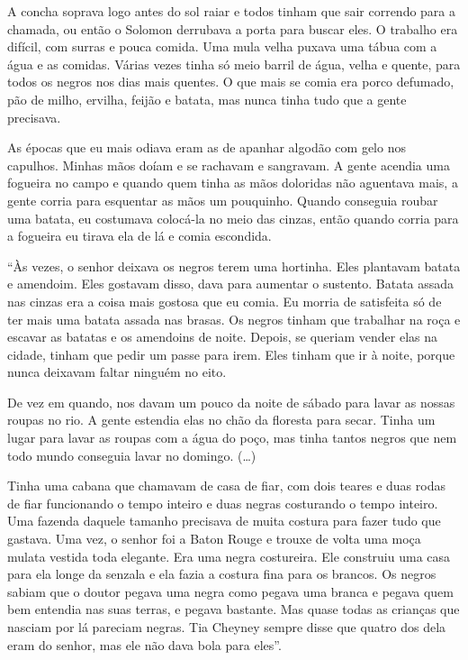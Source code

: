 A concha soprava logo antes do sol raiar e todos tinham que sair
correndo para a chamada, ou então o Solomon derrubava a porta para
buscar eles. O trabalho era difícil, com surras e pouca comida. Uma mula
velha puxava uma tábua com a água e as comidas. Várias vezes tinha só
meio barril de água, velha e quente, para todos os negros nos dias mais
quentes. O que mais se comia era porco defumado, pão de milho, ervilha,
feijão e batata, mas nunca tinha tudo que a gente precisava.

As épocas que eu mais odiava eram as de apanhar algodão com gelo nos
capulhos. Minhas mãos doíam e se rachavam e sangravam. A gente acendia
uma fogueira no campo e quando quem tinha as mãos doloridas não
aguentava mais, a gente corria para esquentar as mãos um pouquinho.
Quando conseguia roubar uma batata, eu costumava colocá-la no meio das
cinzas, então quando corria para a fogueira eu tirava ela de lá e comia
escondida.

``Às vezes, o senhor deixava os negros terem uma hortinha. Eles
plantavam batata e amendoim. Eles gostavam disso, dava para aumentar o
sustento. Batata assada nas cinzas era a coisa mais gostosa que eu
comia. Eu morria de satisfeita só de ter mais uma batata assada nas
brasas. Os negros tinham que trabalhar na roça e escavar as batatas e os
amendoins de noite. Depois, se queriam vender elas na cidade, tinham que
pedir um passe para irem. Eles tinham que ir à noite, porque nunca
deixavam faltar ninguém no eito.

De vez em quando, nos davam um pouco da noite de sábado para lavar as
nossas roupas no rio. A gente estendia elas no chão da floresta para
secar. Tinha um lugar para lavar as roupas com a água do poço, mas tinha
tantos negros que nem todo mundo conseguia lavar no domingo. (\ldots{})

Tinha uma cabana que chamavam de casa de fiar, com dois teares e duas
rodas de fiar funcionando o tempo inteiro e duas negras costurando o
tempo inteiro. Uma fazenda daquele tamanho precisava de muita costura
para fazer tudo que gastava. Uma vez, o senhor foi a Baton Rouge e
trouxe de volta uma moça mulata vestida toda elegante. Era uma negra
costureira. Ele construiu uma casa para ela longe da senzala e ela fazia
a costura fina para os brancos. Os negros sabiam que o doutor pegava uma
negra como pegava uma branca e pegava quem bem entendia nas suas terras,
e pegava bastante. Mas quase todas as crianças que nasciam por lá
pareciam negras. Tia Cheyney sempre disse que quatro dos dela eram do
senhor, mas ele não dava bola para eles''.

